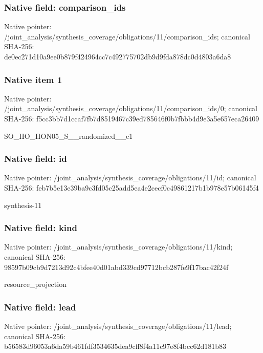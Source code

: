 \documentclass[10pt,a4paper]{article}
\begin{document}
\subsubsection{Native field: comparison\_\allowbreak{}ids}
Native pointer: /joint\_\allowbreak{}analysis/synthesis\_\allowbreak{}coverage/obligations/11/comparison\_\allowbreak{}ids; canonical SHA-256: de0ec271d10a9ee0b879f424964cc7c492775702db9d9fda878dc0d4803a6da8

\subsubsection{Native item 1}
Native pointer: /joint\_\allowbreak{}analysis/synthesis\_\allowbreak{}coverage/obligations/11/comparison\_\allowbreak{}ids/0; canonical SHA-256: f5cc3bb7d1ccaf7fb7d8519467c39ed785646f0b7fbbb4d9e3a5e657eca26409

\begingroup\raggedright\sloppy SO\_\allowbreak{}HO\_\allowbreak{}HON05\_\allowbreak{}S\_\allowbreak{}\_\allowbreak{}randomized\_\allowbreak{}\_\allowbreak{}c1\par\endgroup

\subsubsection{Native field: id}
Native pointer: /joint\_\allowbreak{}analysis/synthesis\_\allowbreak{}coverage/obligations/11/id; canonical SHA-256: feb7b5e13e39ba9c3fd05c25add5ea4e2cecf0c49861217b1b978e57b06145f4

\begingroup\raggedright\sloppy synthesis-11\par\endgroup

\subsubsection{Native field: kind}
Native pointer: /joint\_\allowbreak{}analysis/synthesis\_\allowbreak{}coverage/obligations/11/kind; canonical SHA-256: 98597b09cb9d7213d92c4bfee40d01abd339cd97712bcb287fe9f17bac42f24f

\begingroup\raggedright\sloppy resource\_\allowbreak{}projection\par\endgroup

\subsubsection{Native field: lead}
Native pointer: /joint\_\allowbreak{}analysis/synthesis\_\allowbreak{}coverage/obligations/11/lead; canonical SHA-256: b56583d96053a6da59b461fdf3534635dea9cff8f4a11c97e8f4bcc62d181b83
\end{document}
